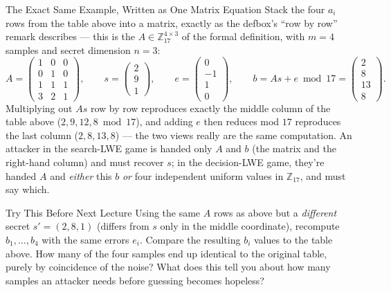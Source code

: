 \begin{rmkbox}{The Exact Same Example, Written as One Matrix Equation}
Stack the four $a_i$ rows from the table above into a matrix, exactly as the defbox's ``row by row'' remark describes --- this is the $A \in \mathbb{Z}_{17}^{4\times 3}$ of the formal definition, with $m=4$ samples and secret dimension $n=3$:
$$
A = \begin{pmatrix} 1 & 0 & 0 \\ 0 & 1 & 0 \\ 1 & 1 & 1 \\ 3 & 2 & 1 \end{pmatrix}, \qquad
s = \begin{pmatrix} 2 \\ 9 \\ 1 \end{pmatrix}, \qquad
e = \begin{pmatrix} 0 \\ -1 \\ 1 \\ 0 \end{pmatrix}, \qquad
b = As + e \bmod 17 = \begin{pmatrix} 2 \\ 8 \\ 13 \\ 8 \end{pmatrix}.
$$
Multiplying out $As$ row by row reproduces exactly the middle column of the table above ($2, 9, 12, 8 \bmod 17$), and adding $e$ then reduces mod $17$ reproduces the last column ($2,8,13,8$) --- the two views really are the same computation. An attacker in the search-LWE game is handed only $A$ and $b$ (the matrix and the right-hand column) and must recover $s$; in the decision-LWE game, they're handed $A$ and \emph{either} this $b$ \emph{or} four independent uniform values in $\mathbb{Z}_{17}$, and must say which.
\end{rmkbox}

\begin{exercisebox}{Try This Before Next Lecture}
Using the same $A$ rows as above but a \emph{different} secret $s' = (2,8,1)$ (differs from $s$ only in the middle coordinate), recompute $b_1,\ldots,b_4$ with the same errors $e_i$. Compare the resulting $b_i$ values to the table above. How many of the four samples end up identical to the original table, purely by coincidence of the noise? What does this tell you about how many samples an attacker needs before guessing becomes hopeless?
\end{exercisebox}

